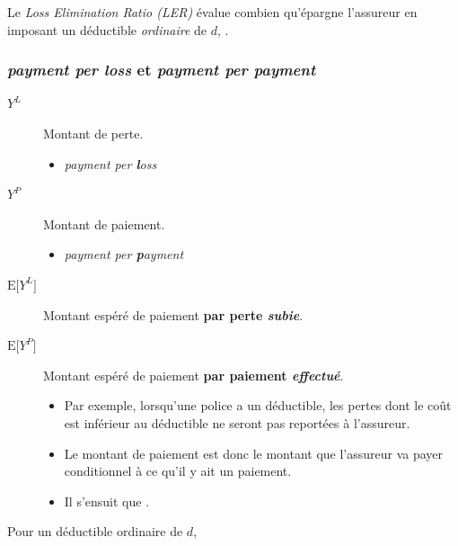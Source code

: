 \documentclass[10pt, french]{article}
\begin{document}
\begin{multicols*}{2}
\begin{definitionNOHFILLprop}
Le \og \textit{Loss Elimination Ratio (LER)} \fg{} évalue combien qu'épargne l'assureur en imposant un déductible \textit{ordinaire} de $d$,
.
\end{definitionNOHFILLprop}


\subsubsection{\og \textit{payment \textbf{per loss}} \fg{} et \og \textit{payment \textbf{per payment}} \fg{}}
\begin{distributions}[Notation]
\begin{description}
	\item[$Y^{L}$]	Montant de perte.
		\begin{itemize}
		\item	\og \textit{payment per \textbf{l}oss} \fg{}
		\end{itemize}
	\item[$Y^{P}$]	Montant de paiement.
		\begin{itemize}
		\item	\og \textit{payment per \textbf{p}ayment} \fg{}
		\end{itemize}
\end{description}
\end{distributions}

\begin{description}
	\item[$\text{E}\lbrack Y^{L} \rbrack$]	Montant espéré de paiement \textbf{par perte \textit{subie}}.
	\item[$\text{E}\lbrack Y^{P}\rbrack$]	Montant espéré de paiement \textbf{par paiement \textit{effectué}}.
		\begin{itemize}
		\item	Par exemple, lorsqu'une police a un déductible, les pertes dont le coût est inférieur au déductible ne seront pas reportées à l'assureur.
		\item	Le montant de paiement est donc le montant que l'assureur va payer conditionnel à ce qu'il y ait un paiement.
		\item	Il s'ensuit que .
		\end{itemize}
\end{description}


Pour un déductible ordinaire de $d$, 


\end{multicols*}
\end{document}
